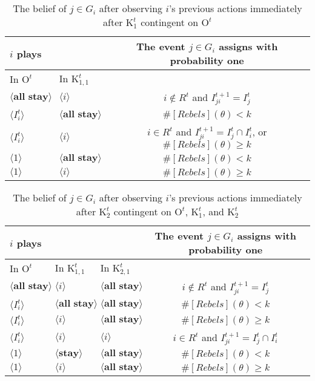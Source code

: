 \documentclass[12pt,letter]{article}
\newcommand{\Kappa}{\mathrm{K}}
\newcommand{\Omicron}{\mathrm{O}}
\theoremstyle{definition}
\theoremstyle{remark}
\theoremstyle{claim}
\begin{document}
\begin{table}[!htbp]
\caption{The belief of $j\in G_i$ after observing $i$'s previous actions immediately after $\Kappa^t_1$ {contingent} on $\Omicron^t$ }
\label{Table_blf_up_cdt1}
\begin{center}
\begin{tabular}{l  l | c}
 $i$ plays	&			  & The event $j\in G_i$ assigns with probability one \\
\hline
\hline
	  In $\Omicron^t$	 	&		In $\Kappa^t_{1,1}$	&				  \\
\hline
$\langle \textbf{all stay} \rangle$  & $\langle i \rangle$	&    $i\notin R^t$ and $I^{t+1}_{ji}=I^t_j$  \\
$\langle I^t_{i} \rangle$  & $\langle \textbf{all stay} \rangle$	&    $\#[Rebels](\theta)< k$ \\
$\langle I^t_{i} \rangle$  & $\langle i \rangle$	&    $i\in R^t$ and $I^{t+1}_{ji}=I^t_j\cap I^t_{i}$,  or $\#[Rebels](\theta)\geq k$ \\
$\langle 1 \rangle$  & $\langle \textbf{all stay} \rangle$	&	  $\#[Rebels](\theta)< k$    \\
$\langle 1 \rangle$  & $\langle i \rangle$	&	  $\#[Rebels](\theta)\geq k$  \\
  \hline
\end{tabular}
\end{center}
\end{table}

\begin{table}[!htbp]
\caption{The belief of $j\in G_i$ after observing $i$'s previous actions immediately after $\Kappa^t_{2}$ {contingent} on $\Omicron^t$, $\Kappa^t_{1}$, and $\Kappa^t_{2}$ }
\label{Table_blf_up_cdt2}
\begin{center}
\begin{tabular}{l  l l | c}
 $i$ plays  	&		&  	  &The event $j\in G_i$ assigns with probability one\\
\hline
\hline
In $\Omicron^t$			&	In $\Kappa^t_{1,1}$			&			In $\Kappa^t_{2,1}$		&   \\
\hline
$\langle \textbf{all stay} \rangle$  & $\langle i \rangle$	&  $\langle \textbf{all stay} \rangle$ &  $i\notin R^t$ and $I^{t+1}_{ji}=I^t_j$  \\
$\langle I^t_{i} \rangle$  & $\langle \textbf{all stay} \rangle$	&  $\langle \textbf{all stay} \rangle$ &  $\#[Rebels](\theta)< k$ \\
$\langle I^t_{i} \rangle$  & $\langle i \rangle$	&  $\langle \textbf{all stay} \rangle$ &  $\#[Rebels](\theta)\geq k$ \\
$\langle I^t_{i} \rangle$  & $\langle i \rangle$	&  $\langle i \rangle$ &  $i\in R^t$ and $I^{t+1}_{ji}=I^t_j\cap I^t_{i}$ \\
$\langle 1 \rangle$  & $\langle \textbf{stay} \rangle$	&	$\langle \textbf{all stay} \rangle$ &  $\#[Rebels](\theta)< k$    \\
$\langle 1 \rangle$  & $\langle i \rangle$	&	$\langle \textbf{all stay} \rangle$ &  $\#[Rebels](\theta)\geq k$  \\
  \hline
\end{tabular}
\end{center}
\end{table}
\end{document}
